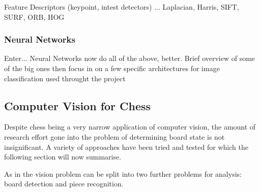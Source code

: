 Feature Descriptors (keypoint, intest detectors) ... Laplacian, Harris, SIFT, SURF, ORB, HOG


\subsubsection{Neural Networks}
Enter...  Neural Networks now do all of the above, better.
Brief overview of some of the big ones then focus in on a few specific architectures for image classification used throught the project



\subsection{Computer Vision for Chess}
Despite chess being a very narrow application of computer vision, the amount of research effort gone into the problem of determining 
board state is not insignificant. 
A variety of approaches have been tried and tested for which the following section will now summarise.

As in \cite{Ding2016ChessVisionC} the vision problem can be split into two further problems for analysis: board detection and piece recognition.

